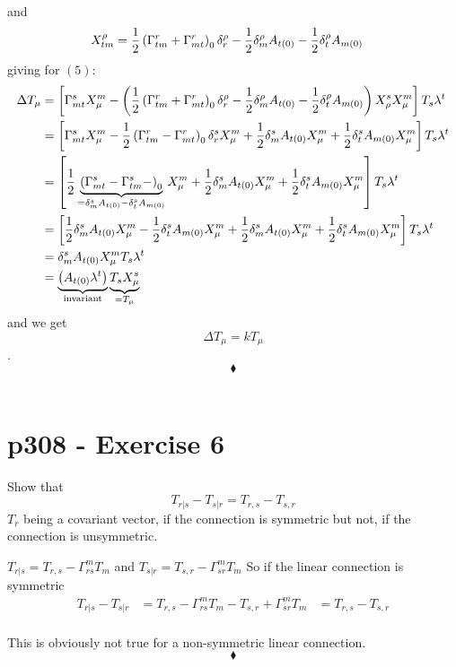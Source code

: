 and 
\begin{align}
X^{\rho}_{tm} &= \frac{1}{2}\left(\Gamma^r_{tm} +\Gamma^r_{mt}\right)_0\delta^{\rho}_r- \frac{1}{2} \delta^{\rho}_m A_{t(0)}- \frac{1}{2} \delta^{\rho}_t A_{m(0)}
\end{align}
giving for $(5)$:
\begin{align}
\Delta T_{\mu} &= \left[ \Gamma^s_{mt}X^m_{\mu}- \left(\frac{1}{2}\left(\Gamma^r_{tm} +\Gamma^r_{mt}\right)_0\delta^{\rho}_r- \frac{1}{2} \delta^{\rho}_m A_{t(0)}- \frac{1}{2} \delta^{\rho}_t A_{m(0)}\right)X^s_{\rho}X^m_{\mu} \right]T_s\lambda^t\\
 &= \left[ \Gamma^s_{mt}X^m_{\mu}- \frac{1}{2}\left(\Gamma^r_{tm} -\Gamma^r_{mt}\right)_0\delta^{s}_rX^m_{\mu}+ \frac{1}{2} \delta^{s}_m A_{t(0)}X^m_{\mu}+ \frac{1}{2} \delta^{s}_t A_{m(0)}X^m_{\mu}\right]T_s\lambda^t\\
 &= \left[ \frac{1}{2}\underbrace{\left(\Gamma^s_{mt}-\Gamma^s_{tm} -\right)_0}_{=\delta^s_mA_{t(0)} - \delta^s_t A_{m(0)}}X^m_{\mu}+ \frac{1}{2} \delta^{s}_m A_{t(0)}X^m_{\mu}+ \frac{1}{2} \delta^{s}_t A_{m(0)}X^m_{\mu}\right]T_s\lambda^t\\
 &= \left[ \frac{1}{2}\delta^s_mA_{t(0)} X^m_{\mu}- \frac{1}{2}\delta^s_t A_{m(0)}X^m_{\mu}+ \frac{1}{2} \delta^{s}_m A_{t(0)}X^m_{\mu}+ \frac{1}{2} \delta^{s}_t A_{m(0)}X^m_{\mu}\right]T_s\lambda^t\\
 &=  \delta^s_mA_{t(0)} X^m_{\mu}T_s\lambda^t\\
 &= \underbrace{\left(A_{t(0)} \lambda^t\right)}_{\text{invariant}}\underbrace{T_sX^s_{\mu}}_{= T_{\mu}}\\
\end{align}
and we get $$\Delta T_{\mu}= kT_{\mu}$$.
$$\blacklozenge$$\\
\newpage



\section{p308 - Exercise 6}
\begin{tcolorbox}
Show that $$T_{r|s} - T_{s|r}= T_{r,s}-T_{s,r}$$
$T_r$ being a covariant vector, if the connection is symmetric but not, if the connection is unsymmetric.
\end{tcolorbox}
$T_{r|s} = T_{r,s}-\Gamma^m_{rs}T_m$ and $T_{s|r} = T_{s,r}-\Gamma^m_{sr}T_m$
So if the linear connection is symmetric
\begin{align}
T_{r|s} - T_{s|r}&= T_{r,s}-\Gamma^m_{rs}T_m-T_{s,r}+\Gamma^m_{sr}T_m
&= T_{r,s}-T_{s,r}
\end{align}\\
This is obviously not true for a non-symmetric linear connection.
$$\blacklozenge$$\\
\newpage

